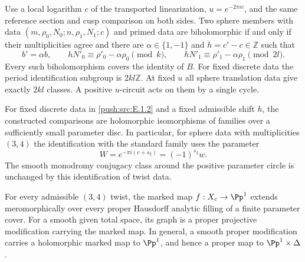 \begin{theorem}\hypertarget{tag-032S}{}\label{push:src:E.1.2}


Use a local logarithm $c$ of the transported linearization,
$u=e^{-2\pi i c}$, and the same reference section and cusp comparison
on both sides.  Two sphere members with data
$(m,\rho_0,N_0;n,\rho_1,N_1;c)$ and primed data are biholomorphic
if and only if their multiplicities agree and there are
$\alpha\in\{1,-1\}$ and $h=c'-c\in\mathbb Z$ such that
\[
 b'=\alpha b,\qquad
 hN'_0\equiv\rho'_0-\alpha\rho_0\pmod{k},\qquad
 hN'_1\equiv\rho'_1-\alpha\rho_1\pmod{2l}.
\]
Every such biholomorphism covers the identity of $B$.
For fixed discrete data the period identification subgroup is
$2kl\mathbb Z$.  At fixed $u$ all sphere translation data give
exactly $2kl$ classes.  A positive $u$-circuit acts on them by a
single cycle.
\end{theorem}

\begin{corollary}\hypertarget{tag-032T}{}\label{push:src:E.1.3}


For fixed discrete data in \ref{push:src:E.1.2} and a fixed admissible shift $h$,
the constructed comparisons are holomorphic isomorphisms of families
over a sufficiently small parameter disc.  In particular, for sphere
data with multiplicities $(3,4)$ the identification with the standard
family uses the parameter
\[
 W=e^{-\pi i(c+s_2)}=(-1)^{s_2}w.
\]
The smooth monodromy conjugacy class around the positive parameter
circle is unchanged by this identification of twist data.
\end{corollary}

\begin{theorem}\hypertarget{tag-02RE}{}\label{night:P2.4}\label{stmt:P2.4}

\hypertarget{tag-0314}{}\label{push:src:B.4.4}



For every admissible $(3,4)$ twist, the marked map $f:X_c\to\Pp^1$ extends meromorphically over every proper Hausdorff analytic filling of a finite parameter cover. For a smooth given total space, its graph is a proper projective modification carrying the marked map. In general, a smooth proper modification carries a holomorphic marked map to $\Pp^1$, and hence a proper map to $\Pp^1\times\Delta$.
\end{theorem}

